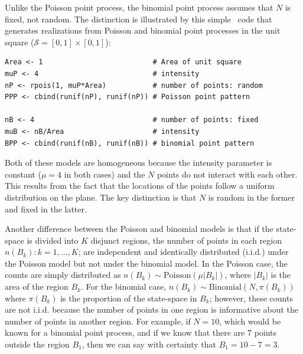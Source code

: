 Unlike the Poisson point process, the
binomial point process assumes that $N$ is fixed, not random.
The distinction is illustrated by this simple \R~code that generates
realizations from Poisson and binomial point processes in the unit
square ($\mathcal{S} = [0,1]\times[0,1]$):

\begin{samepage}
\begin{verbatim}
Area <- 1                          # Area of unit square
muP <- 4                           # intensity
nP <- rpois(1, muP*Area)           # number of points: random
PPP <- cbind(runif(nP), runif(nP)) # Poisson point pattern

nB <- 4                            # number of points: fixed
muB <- nB/Area                     # intensity
BPP <- cbind(runif(nB), runif(nB)) # binomial point pattern
\end{verbatim}
\end{samepage}

{\flushleft Both of these models are homogeneous because the intensity parameter
is constant ($\mu=4$ in both cases) and the $N$ points do not interact
with each other. This results from the fact that the locations of the
points follow a uniform distribution on the plane. The key distinction
is that $N$ is random in the former and fixed in the latter.}

Another difference between the Poisson and binomial models is that if the
state-space is divided into $K$ disjunct regions, the number of points in each
region $n(B_k): k=1,\dots,K$; are independent and identically
distributed (i.i.d.) under the Poisson model but not under the
binomial model. In the Poisson case,
the counts are simply distributed as $n(B_k) \sim
\text{Poisson}(\mu|B_k|)$, where $|B_k|$ is the area of the region
$B_k$. For the binomial case, $n(B_k) \sim
\text{Binomial}(N, \pi(B_k))$ where $\pi(B_k)$ is the proportion of
the state-space in $B_k$; however, these counts are not
i.i.d. because the number of points in one region is informative
about the number of points in another region. For example, if
$N=10$, which would be known for a binomial point process, and if we
know that there are 7 points outside the region $B_1$,
then we can say with certainty that $B_1 = 10 - 7 = 3$.

